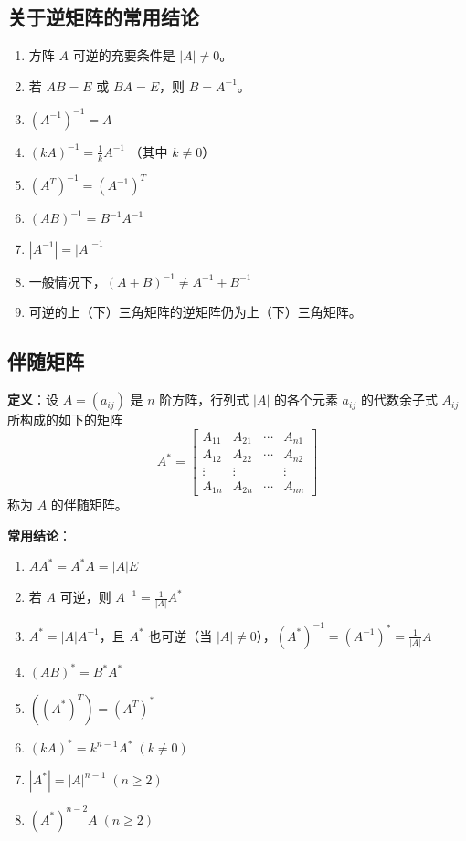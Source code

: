 \documentclass[UTF8]{ctexart}
\theoremstyle{mydef}
\begin{document}
\subsection{关于逆矩阵的常用结论}
\begin{enumerate}
    \item 方阵 $A$ 可逆的充要条件是 $|A| \neq 0$。
    \item 若 $AB = E$ 或 $BA = E$，则 $B = A^{-1}$。
    \item $(A^{-1})^{-1} = A$
    \item $(kA)^{-1} = \frac{1}{k}A^{-1}$ （其中 $k \neq 0$）
    \item $(A^T)^{-1} = (A^{-1})^T$
    \item $(AB)^{-1} = B^{-1}A^{-1}$
    \item $|A^{-1}| = |A|^{-1}$
    \item 一般情况下，$(A+B)^{-1} \neq A^{-1} + B^{-1}$
    \item 可逆的上（下）三角矩阵的逆矩阵仍为上（下）三角矩阵。
\end{enumerate}

\subsection{伴随矩阵}
\textbf{定义}：设 $A=(a_{ij})$ 是 $n$ 阶方阵，行列式 $|A|$ 的各个元素 $a_{ij}$ 的代数余子式 $A_{ij}$ 所构成的如下的矩阵
$$
A^* = \begin{bmatrix}
A_{11} & A_{21} & \cdots & A_{n1} \\
A_{12} & A_{22} & \cdots & A_{n2} \\
\vdots & \vdots & & \vdots \\
A_{1n} & A_{2n} & \cdots & A_{nn}
\end{bmatrix}
$$
称为 $A$ 的伴随矩阵。

\textbf{常用结论}：
\begin{enumerate}
    \item $A A^* = A^* A = |A|E$
    \item 若 $A$ 可逆，则 $A^{-1} = \frac{1}{|A|}A^*$
    \item $A^* = |A|A^{-1}$，且 $A^*$ 也可逆（当 $|A| \neq 0$），$(A^*)^{-1} = (A^{-1})^* = \frac{1}{|A|}A$
    \item $(AB)^* = B^* A^*$
    \item $((A^*)^T) = (A^T)^*$
    \item $(kA)^* = k^{n-1} A^* \; (k \neq 0)$
    \item $|A^*| = |A|^{n-1} \; (n \geq 2)$
    \item $(A^*)^{n-2} A \; (n \geq 2)$
\end{enumerate}
\end{document}
